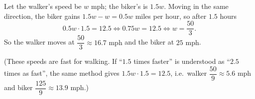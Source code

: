 Let the walker's speed be $w$ mph; the biker's is $1.5w$. Moving in the same direction, the biker gains $1.5w-w=0.5w$ miles per hour, so after $1.5$ hours
\[
0.5w\cdot1.5=12.5\iff0.75w=12.5\iff w=\dfrac{50}{3}.
\]
So the walker moves at $\boxed{\dfrac{50}{3}\approx16.7\text{ mph}}$ and the biker at $\boxed{25\text{ mph}}$.

(These speeds are fast for walking. If ``$1.5$ times faster'' is understood as ``$2.5$ times as fast'', the same method gives $1.5w\cdot1.5=12.5$, i.e.\ walker $\dfrac{50}{9}\approx5.6$ mph and biker $\dfrac{125}{9}\approx13.9$ mph.)
